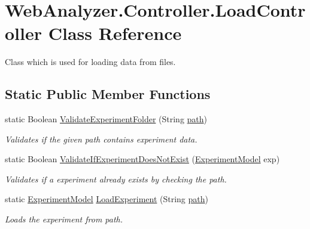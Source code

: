 \hypertarget{class_web_analyzer_1_1_controller_1_1_load_controller}{}\section{Web\+Analyzer.\+Controller.\+Load\+Controller Class Reference}
\label{class_web_analyzer_1_1_controller_1_1_load_controller}


Class which is used for loading data from files.  


\subsection*{Static Public Member Functions}
\begin{DoxyCompactItemize}
\item 
static Boolean \hyperlink{class_web_analyzer_1_1_controller_1_1_load_controller_a4ccfcc1eddcf758a1d9c3df334750a05}{Validate\+Experiment\+Folder} (String \hyperlink{bin_2x64_2_release_2_u_i_2_h_t_m_l_resources_2js_2src_2create__experiment_8js_aa72e0c8a20e6bcc571d3a1c51846e627}{path})
\begin{DoxyCompactList}\small\item\em Validates if the given path contains experiment data. \end{DoxyCompactList}\item 
static Boolean \hyperlink{class_web_analyzer_1_1_controller_1_1_load_controller_a2cf58e1b4a77099dc5fa14f4743fcb16}{Validate\+If\+Experiment\+Does\+Not\+Exist} (\hyperlink{class_web_analyzer_1_1_models_1_1_base_1_1_experiment_model}{Experiment\+Model} exp)
\begin{DoxyCompactList}\small\item\em Validates if a experiment already exists by checking the path. \end{DoxyCompactList}\item 
static \hyperlink{class_web_analyzer_1_1_models_1_1_base_1_1_experiment_model}{Experiment\+Model} \hyperlink{class_web_analyzer_1_1_controller_1_1_load_controller_a49122060869d7d678c3f0518f70bbe04}{Load\+Experiment} (String \hyperlink{bin_2x64_2_release_2_u_i_2_h_t_m_l_resources_2js_2src_2create__experiment_8js_aa72e0c8a20e6bcc571d3a1c51846e627}{path})
\begin{DoxyCompactList}\small\item\em Loads the experiment from path. \end{DoxyCompactList}\item 

\end{DoxyCompactItemize}
